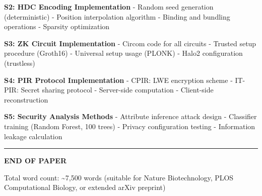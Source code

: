 \documentclass[
  11pt,
]{article}
\begin{document}
\textbf{S2: HDC Encoding Implementation} - Random seed generation
(deterministic) - Position interpolation algorithm - Binding and
bundling operations - Sparsity optimization

\textbf{S3: ZK Circuit Implementation} - Circom code for all circuits -
Trusted setup procedure (Groth16) - Universal setup usage (PLONK) -
Halo2 configuration (trustless)

\textbf{S4: PIR Protocol Implementation} - CPIR: LWE encryption scheme -
IT-PIR: Secret sharing protocol - Server-side computation - Client-side
reconstruction

\textbf{S5: Security Analysis Methods} - Attribute inference attack
design - Classifier training (Random Forest, 100 trees) - Privacy
configuration testing - Information leakage calculation

\begin{center}\rule{0.5\linewidth}{0.5pt}\end{center}

\textbf{END OF PAPER}

Total word count: \textasciitilde7,500 words (suitable for Nature
Biotechnology, PLOS Computational Biology, or extended arXiv preprint)
\end{document}

